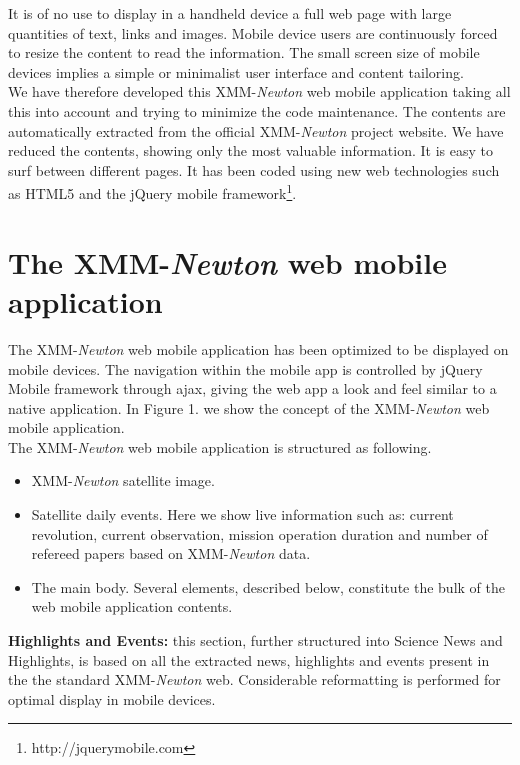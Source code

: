 It is of no use to display in a handheld device a full web page with
large quantities of text, links and images. Mobile device users are
continuously forced to resize the content to read the information. The
small screen size of mobile devices implies a simple or minimalist user
interface and content tailoring.\\

We have therefore developed this XMM-{\em Newton} web mobile application taking
all this into account and trying to minimize the code maintenance. The
contents are automatically extracted from the official XMM-{\em Newton} project
website. We have reduced the contents, showing only the most valuable
information. It is easy to surf between different pages. It has been
coded using new web technologies such as HTML5 and the jQuery mobile
framework\footnote{http://jquerymobile.com}.

\section{The XMM-{\em Newton} web mobile application}

The XMM-{\em Newton} web mobile application has been optimized to be displayed on
mobile devices. The navigation within the mobile app is controlled by
jQuery Mobile framework through ajax, giving the web app a look and
feel similar to a native application. In Figure 1. we show the concept
of the XMM-{\em Newton} web mobile application.\\

The XMM-{\em Newton} web mobile application is structured as following.
\begin{itemize}
\item XMM-{\em Newton} satellite image.
\item Satellite daily events. Here we show live information such as: current revolution, 
current observation, mission operation duration and number of refereed papers based on 
XMM-{\em Newton} data.
\item The main body. Several elements, described below, constitute the 
bulk of the web mobile application contents.
\end{itemize}

{\bf Highlights and Events:} this section, further structured into
Science News and Highlights, is based on all the extracted news,
highlights and events present in the the standard XMM-{\em Newton}
web. Considerable reformatting is performed for optimal display in
mobile devices.\\

